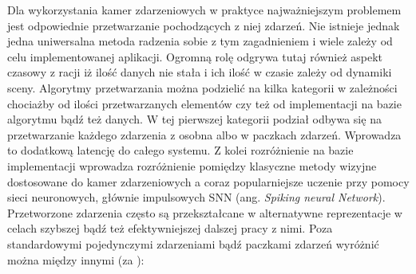     Dla wykorzystania kamer zdarzeniowych w praktyce najważniejszym problemem jest odpowiednie przetwarzanie pochodzących z niej zdarzeń. Nie istnieje jednak jedna uniwersalna metoda radzenia sobie z tym zagadnieniem i wiele zależy od celu implementowanej aplikacji. Ogromną rolę odgrywa tutaj również aspekt czasowy z racji iż ilość danych nie stała i ich ilość w czasie zależy od dynamiki sceny. Algorytmy przetwarzania można podzielić na kilka kategorii w zależności chociażby od ilości przetwarzanych elementów czy też od implementacji na bazie algorytmu bądź też danych. W tej pierwszej kategorii podział odbywa się na przetwarzanie każdego zdarzenia z osobna  albo w paczkach zdarzeń. Wprowadza to dodatkową latencję do całego systemu. Z kolei rozróżnienie na bazie implementacji wprowadza rozróżnienie pomiędzy klasyczne metody wizyjne dostosowane do kamer zdarzeniowych a coraz popularniejsze uczenie przy pomocy sieci neuronowych, głównie impulsowych SNN (ang. \emph{Spiking neural Network}).\\
    Przetworzone zdarzenia często są przekształcane w alternatywne reprezentacje w celach szybszej bądź też efektywniejszej dalszej pracy z nimi. Poza standardowymi pojedynczymi zdarzeniami bądź paczkami zdarzeń wyróżnić można między innymi (za \cite{1}):
